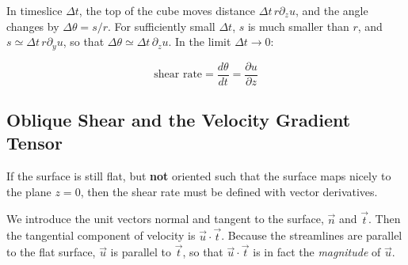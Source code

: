 \documentclass[a4paper]{report}
\begin{document}
In timeslice $\Delta t$, the top of the cube moves distance $\Delta t \, r \partial_z u$, and the angle changes by $\Delta \theta = s/r$.  For sufficiently small $\Delta t$, $s$ is much smaller than $r$, and $s \simeq \Delta t \, r \partial_y u$, so that $\Delta \theta \simeq \Delta t \, \partial_z u$.  In the limit $\Delta t \rightarrow 0$:

\begin{equation}
\text{shear rate} = \frac{d \theta}{d t} = \frac{\partial u}{\partial z}
\end{equation}


\subsection*{Oblique Shear and the Velocity Gradient Tensor}
If the surface is still flat, but \textbf{not} oriented such that the surface maps nicely to the plane $z=0$, then the shear rate must be defined with vector derivatives.

\begin{center}
\end{center}

We introduce the unit vectors normal and tangent to the surface, $\vec{n}$ and $\vec{t}$. Then the tangential component of velocity is $ \vec{u} \cdot \vec{t}$.  
Because the streamlines are parallel to the flat surface, $\vec{u}$ is parallel to $\vec{t}$, so that $\vec{u} \cdot \vec{t}$ is in fact the \emph{magnitude} of $\vec{u}$.
\end{document}

